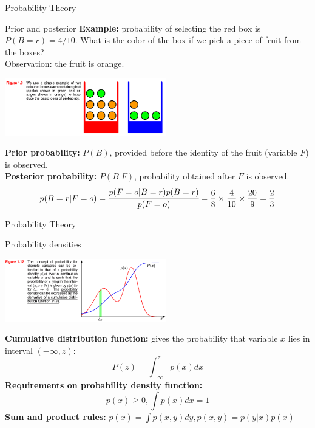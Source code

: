 \documentclass[9pt]{beamer}
\begin{document}
\begin{frame}{Probability Theory}
    \begin{alertblock}{Prior and posterior}
        \textbf{Example:} probability of selecting the red box is $P(B = r) = 4/10$.
        What is the color of the box if we pick a piece of fruit from the boxes?\\
        Observation: the fruit is orange.
        \begin{center}
            \setlength{\fboxsep}{0.5pt} %
            \setlength{\fboxrule}{0.5pt}
            \includegraphics[width=7.0cm,fbox]{../images/Bishop_MachineLearning_Figure1-9.png} %
        \end{center}
        \textbf{Prior probability:} $P(B)$, provided before the identity of the fruit (variable $F$) is observed.\\
        \textbf{Posterior probability:} $P(B|F)$, probability obtained after $F$ is observed.
        \[ p(B=r|F=o) = \cfrac{p(F=o|B=r)p(B=r)}{p(F=o)} = \frac{6}{8} \times \frac{4}{10} \times \frac{20}{9} = \frac{2}{3} \]
    \end{alertblock}
\end{frame}

\begin{frame}{Probability Theory}
    \begin{alertblock}{Probability densities}
        \begin{center}
            \setlength{\fboxsep}{0.5pt} %
            \setlength{\fboxrule}{0.5pt}
            \includegraphics[width=7.0cm,fbox]{../images/Bishop_MachineLearning_Figure1-12.png} %
        \end{center}
        \textbf{Cumulative distribution function:} gives the probability that variable $x$ lies in interval $(-\infty, z)$:
            \[ P(z) = \int_{-\infty}^{z} p(x) dx \]
        \textbf{Requirements on probability density function:}
            \[ p(x) \geq 0, \int p(x) dx = 1 \]
        \textbf{Sum and product rules:} $p(x) = \int p(x, y) dy, p(x, y) = p(y|x) p(x)$
    \end{alertblock}
\end{frame}
\end{document}

